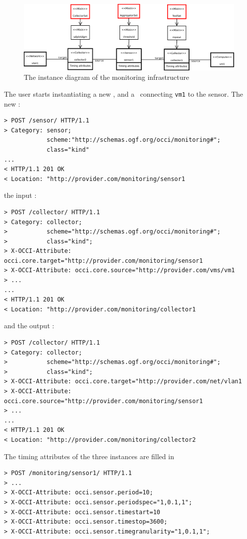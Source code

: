 \documentclass[12pt]{article}  %
\begin{document}
\begin{figure}
\centering
\includegraphics[width=\linewidth]{newDiagram_V3.pdf}
\caption{The instance diagram of the monitoring infrastructure \label{fig:example}}
\end{figure}

The user starts instantiating a new \sens, and a \coll\ connecting {\tt vm1} to the sensor. The new \sens:

\begin{verbatim}
> POST /sensor/ HTTP/1.1
> Category: sensor; 
            scheme:"http://schemas.ogf.org/occi/monitoring#"; 
            class="kind"
...
< HTTP/1.1 201 OK
< Location: "http://provider.com/monitoring/sensor1
\end{verbatim}

the input \coll:

\begin{verbatim}
> POST /collector/ HTTP/1.1
> Category: collector;
>           scheme="http://schemas.ogf.org/occi/monitoring#";
>           class="kind";
> X-OCCI-Attribute: occi.core.target="http://provider.com/monitoring/sensor1
> X-OCCI-Attribute: occi.core.source="http://provider.com/vms/vm1
> ...
...
< HTTP/1.1 201 OK
< Location: "http://provider.com/monitoring/collector1
\end{verbatim}

and the output \coll:

\begin{verbatim}
> POST /collector/ HTTP/1.1
> Category: collector;
>           scheme="http://schemas.ogf.org/occi/monitoring#";
>           class="kind";
> X-OCCI-Attribute: occi.core.target="http://provider.com/net/vlan1
> X-OCCI-Attribute: occi.core.source="http://provider.com/monitoring/sensor1
> ...
...
< HTTP/1.1 201 OK
< Location: "http://provider.com/monitoring/collector2
\end{verbatim}

The timing attributes of the three instances are filled in

\begin{verbatim}
> POST /monitoring/sensor1/ HTTP/1.1
> ...
> X-OCCI-Attribute: occi.sensor.period=10;
> X-OCCI-Attribute: occi.sensor.periodspec="1,0.1,1";
> X-OCCI-Attribute: occi.sensor.timestart=10
> X-OCCI-Attribute: occi.sensor.timestop=3600;
> X-OCCI-Attribute: occi.sensor.timegranularity="1,0.1,1";
\end{verbatim}
\end{document}
